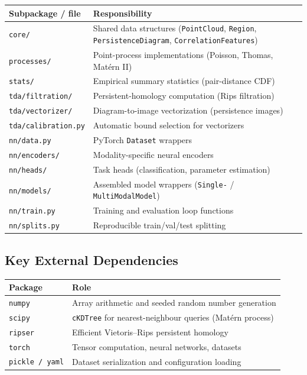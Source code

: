 \documentclass[11pt, a4paper]{article}
\newcommand{\code}[1]{\texttt{#1}}
\begin{document}
\begin{center}
\begin{tabular}{ll}
\toprule
\textbf{Subpackage / file} & \textbf{Responsibility} \\
\midrule
\code{core/}            & Shared data structures (\code{PointCloud}, \code{Region},
                          \code{PersistenceDiagram}, \code{CorrelationFeatures}) \\
\code{processes/}       & Point-process implementations (Poisson, Thomas, Matérn II) \\
\code{stats/}           & Empirical summary statistics (pair-distance CDF) \\
\code{tda/filtration/}  & Persistent-homology computation (Rips filtration) \\
\code{tda/vectorizer/}  & Diagram-to-image vectorization (persistence images) \\
\code{tda/calibration.py} & Automatic bound selection for vectorizers \\
\code{nn/data.py}       & PyTorch \code{Dataset} wrappers \\
\code{nn/encoders/}     & Modality-specific neural encoders \\
\code{nn/heads/}        & Task heads (classification, parameter estimation) \\
\code{nn/models/}       & Assembled model wrappers (\code{Single-} / \code{MultiModalModel}) \\
\code{nn/train.py}      & Training and evaluation loop functions \\
\code{nn/splits.py}     & Reproducible train/val/test splitting \\
\bottomrule
\end{tabular}
\end{center}

\subsection{Key External Dependencies}

\begin{center}
\begin{tabular}{ll}
\toprule
\textbf{Package} & \textbf{Role} \\
\midrule
\code{numpy}        & Array arithmetic and seeded random number generation \\
\code{scipy}        & \code{cKDTree} for nearest-neighbour queries (Matérn process) \\
\code{ripser}       & Efficient Vietoris--Rips persistent homology \\
\code{torch}        & Tensor computation, neural networks, datasets \\
\code{pickle / yaml}& Dataset serialization and configuration loading \\
\bottomrule
\end{tabular}
\end{center}
\end{document}
